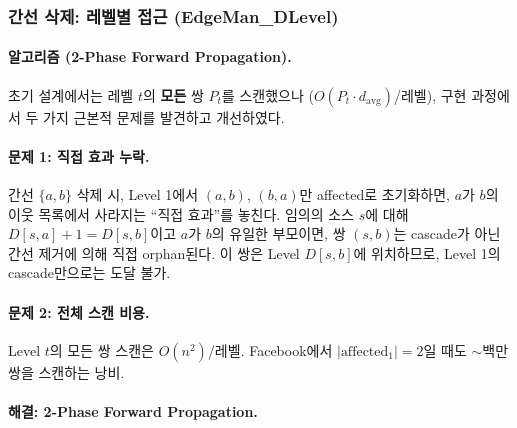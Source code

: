 \documentclass[11pt,a4paper]{article}
\begin{document}
\subsubsection{간선 삭제: 레벨별 접근 (EdgeMan\_DLevel)}

\paragraph{알고리즘 (2-Phase Forward Propagation).}
초기 설계에서는 레벨 $t$의 \textbf{모든} 쌍 $P_t$를 스캔했으나 ($O(P_t \cdot d_{\text{avg}})$/레벨), 구현 과정에서 두 가지 근본적 문제를 발견하고 개선하였다.

\paragraph{문제 1: 직접 효과 누락.}
간선 $\{a,b\}$ 삭제 시, Level 1에서 $(a,b)$, $(b,a)$만 affected로 초기화하면, $a$가 $b$의 이웃 목록에서 사라지는 ``직접 효과''를 놓친다. 임의의 소스 $s$에 대해 $D[s,a]+1 = D[s,b]$이고 $a$가 $b$의 유일한 부모이면, 쌍 $(s,b)$는 cascade가 아닌 간선 제거에 의해 직접 orphan된다. 이 쌍은 Level $D[s,b]$에 위치하므로, Level 1의 cascade만으로는 도달 불가.

\paragraph{문제 2: 전체 스캔 비용.}
Level $t$의 모든 쌍 스캔은 $O(n^2)$/레벨. Facebook에서 $|\text{affected}_1| = 2$일 때도 $\sim$백만 쌍을 스캔하는 낭비.

\paragraph{해결: 2-Phase Forward Propagation.}
\end{document}
